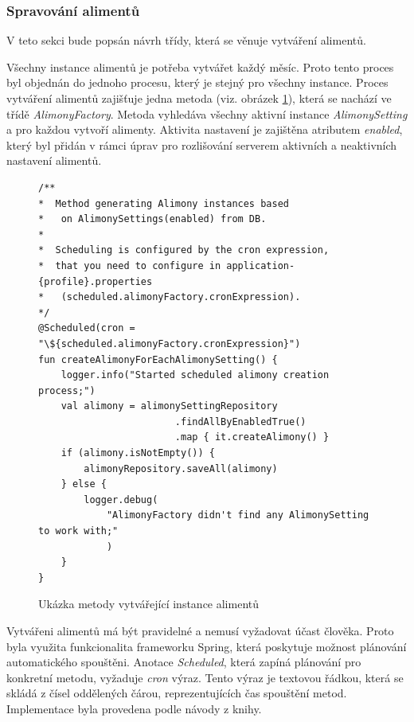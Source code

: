         \subsubsection{Spravování alimentů} 
            V teto sekci bude popsán návrh třídy, která se věnuje vytváření alimentů.
        
            Všechny instance alimentů je potřeba vytvářet každý měsíc. Proto tento proces byl objednán do jednoho procesu, který je stejný pro všechny instance. Proces vytváření alimentů zajišťuje jedna metoda (viz. obrázek \ref{code:create-alimony}), která se nachází ve třídě \textit{AlimonyFactory}. Metoda vyhledáva všechny aktivní instance \textit{AlimonySetting} a pro každou vytvoří alimenty. Aktivita nastavení je zajištěna atributem \textit{enabled}, který byl přidán v rámci úprav pro rozlišování serverem aktivních a neaktivních nastavení alimentů.
            \begin{figure}
                \begin{verbatim}
/**
*  Method generating Alimony instances based 
*   on AlimonySettings(enabled) from DB.
*
*  Scheduling is configured by the cron expression,
*  that you need to configure in application-{profile}.properties 
*   (scheduled.alimonyFactory.cronExpression).
*/
@Scheduled(cron = "\${scheduled.alimonyFactory.cronExpression}")
fun createAlimonyForEachAlimonySetting() {
    logger.info("Started scheduled alimony creation process;")
    val alimony = alimonySettingRepository
                        .findAllByEnabledTrue()
                        .map { it.createAlimony() }
    if (alimony.isNotEmpty()) {
        alimonyRepository.saveAll(alimony)
    } else {
        logger.debug(
            "AlimonyFactory didn't find any AlimonySetting to work with;"
            )
    }
}
                \end{verbatim}
                \caption{Ukázka metody vytvářející instance alimentů} 
                \label{code:create-alimony}
            \end{figure}
            
            Vytvářeni alimentů má být pravidelné a nemusí vyžadovat účast člověka. Proto byla využita funkcionalita frameworku Spring, která poskytuje možnost plánování automatického spouštěni. \cite{spring-scheduling}Anotace \textit{Scheduled}, která zapíná plánování pro konkretní metodu, vyžaduje \textit{cron} výraz. Tento výraz je textovou řádkou, která se skládá z čísel oddělených čárou, reprezentujících čas spouštění metod\cite{cron-expression}. Implementace byla provedena podle návody z knihy\cite{sbr:spring-task-scheduling}.
            
